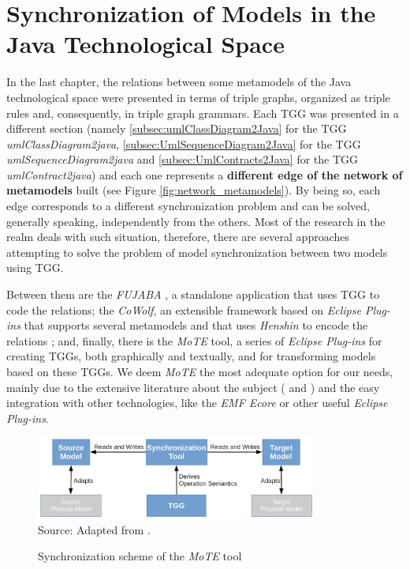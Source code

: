 \documentclass[tuberlin,cic,tc,english,noabntcite,oneside]{iiufrgs}
\begin{document}
\chapter{Synchronization of Models in the Java Technological Space}
\label{chapter:metamodel_synchronization}

In the last chapter, the relations between some metamodels of the Java technological space were presented in terms of triple graphs, organized as triple rules and, consequently, in triple graph grammars. Each TGG was presented in a different section (namely \ref{subsec:umlClassDiagram2Java} for the TGG \emph{umlClassDiagram2java}, \ref{subsec:UmlSequenceDiagram2Java} for the TGG \emph{umlSequenceDiagram2java} and \ref{subsec:UmlContracts2Java} for the TGG \emph{umlContract2java}) and each one represents a \textbf{different edge of the network of metamodels} built (see Figure \ref{fig:network_metamodels}). By being so, each edge corresponds to a different synchronization problem and can be solved, generally speaking, independently from the others. Most of the research in the realm deals with such situation, therefore, there are several approaches attempting to solve the problem of model synchronization between two models using TGG.

Between them are the \emph{FUJABA} \citep{nickel2000fujaba}, a standalone application that uses TGG to code the relations; the \emph{CoWolf}, an extensible framework based on \emph{Eclipse Plug-ins} that supports several metamodels and that uses \emph{Henshin} \citep{arendt2010henshin} to encode the relations \citep{getir2015cowolf}; and, finally, there is the \emph{MoTE} tool, a series of \emph{Eclipse Plug-ins} for creating TGGs, both graphically and textually, and for transforming models based on these TGGs. We deem \emph{MoTE} the most adequate option for our needs, mainly due to the extensive literature about the subject (\citealp{giese2009efficient} and \citealp{hildebrandt2012mdelab}) and the easy integration with other technologies, like the \emph{EMF Ecore} or other useful \emph{Eclipse Plug-ins}.

\begin{figure}[H]
	\centering
    \caption{Synchronization scheme of the \emph{MoTE} tool}
    \includegraphics[width=25em]{MoTE_scheme} \\
    Source: Adapted from \citet{giese2010model}.
    \label{fig:MoTE_scheme}
\end{figure}
\end{document}
